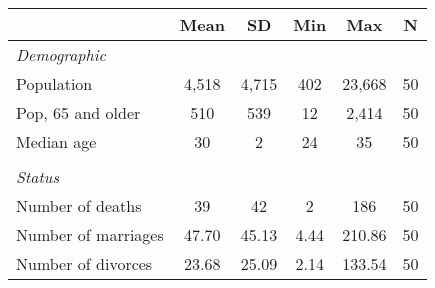 \begin{tabular}{l*{1}{ccccc}}
\toprule
                &     Mean&       SD&      Min&      Max&        N\\
\midrule
\emph{Demographic}&         &         &         &         &         \\
\hspace{0.25cm} Population&    4,518&    4,715&      402&   23,668&       50\\
\hspace{0.25cm} Pop, 65 and older&      510&      539&       12&    2,414&       50\\
\hspace{0.25cm} Median age&       30&        2&       24&       35&       50\\
\vspace{0.1em} \\ \emph{Status}&         &         &         &         &         \\
\hspace{0.25cm} Number of deaths&       39&       42&        2&      186&       50\\
\hspace{0.25cm} Number of marriages&    47.70&    45.13&     4.44&   210.86&       50\\
\hspace{0.25cm} Number of divorces&    23.68&    25.09&     2.14&   133.54&       50\\
\bottomrule
\end{tabular}
